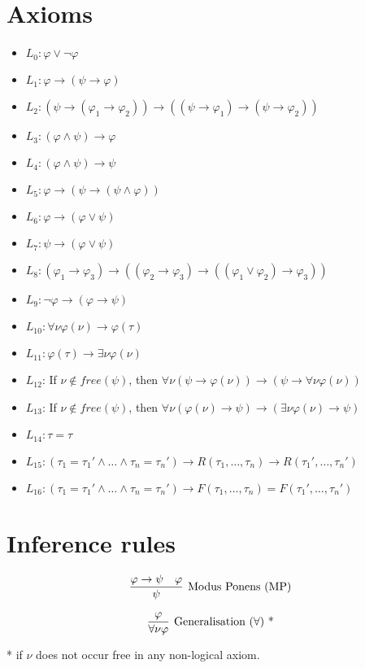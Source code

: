 \documentclass{article}
\renewcommand{\phi}{\varphi}
\newcommand{\ra}{\rightarrow}
\begin{document}
\section{Axioms}

\begin{itemize}
	\item $L_0: \phi \lor \lnot \phi$
	\item $L_1: \phi \ra (\psi \ra \phi)$
	\item $L_2: (\psi \ra (\phi_1 \ra \phi_2)) \ra
	((\psi \ra \phi_1) \ra (\psi \ra \phi_2))$
	\item $L_3: (\phi \land \psi) \ra \phi$
	\item $L_4: (\phi \land \psi) \ra \psi$
	\item $L_5: \phi \ra (\psi \ra (\psi \land \phi))$
	\item $L_6: \phi \ra (\phi \lor \psi)$
	\item $L_7: \psi \ra (\phi \lor \psi)$
	\item $L_8: (\phi_1 \ra \phi_3) \ra
	((\phi_2 \ra \phi_3) \ra ((\phi_1 \lor \phi_2) \ra \phi_3))$
	\item $L_9: \lnot \phi \ra (\phi \ra \psi)$
	\item $L_{10}: \forall \nu \phi(\nu) \ra \phi(\tau)$
	\item $L_{11}: \phi(\tau) \ra \exists \nu \phi(\nu)$
	\item $L_{12}$: If $\nu \not \in free(\psi)$, then
$\forall \nu (\psi \ra \phi(\nu)) \ra (\psi \ra \forall \nu \phi(\nu))$
	\item $L_{13}$: If $\nu \not \in free(\psi)$, then
$\forall \nu (\phi(\nu) \ra \psi) \ra (\exists \nu \phi(\nu) \ra \psi)$
	\item $L_{14}: \tau = \tau$
	\item $L_{15}: (\tau_1 = \tau_1' \land \ldots \land \tau_n = \tau_n') \ra
	R(\tau_1, \ldots, \tau_n) \ra R(\tau_1', \ldots, \tau_n')$
	\item $L_{16}: (\tau_1 = \tau_1' \land \ldots \land \tau_n = \tau_n') \ra
	F(\tau_1, \ldots, \tau_n) = F(\tau_1', \ldots, \tau_n')$

\end{itemize}

\section{Inference rules}

$$
\infer[\text{Modus Ponens (MP)}] {\psi} {\phi \ra \psi \quad \phi}
$$

$$
\infer[\text{Generalisation ($\forall$) *}] {\forall \nu \phi} {\phi}
$$

* if $\nu$ does not occur free in any non-logical axiom.
\end{document}
